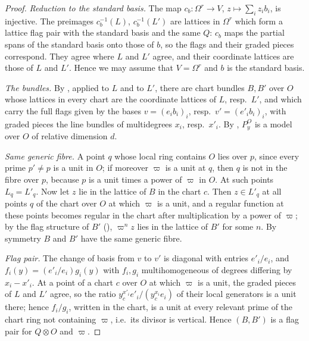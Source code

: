 \begin{proof}
\emph{Reduction to the standard basis.} The map $c_b\colon\Omega^r\to V$, $z\mapsto\sum_iz_ib_i$, is injective.
The preimages $c_b^{-1}(L)$, $c_b^{-1}(L')$ are lattices in $\Omega^r$ which form a lattice flag pair with the
standard basis and the same $Q$: $c_b$ maps the partial spans of the standard basis onto those of $b$, so the flags
and their graded pieces correspond. They agree where $L$ and $L'$ agree, and their coordinate lattices are those of
$L$ and $L'$. Hence we may assume that $V=\Omega^r$ and $b$ is the standard basis.

\emph{The bundles.} By , applied to $L$ and to $L'$, there
are chart bundles $B,B'$ over $O$ whose lattices in every chart are the coordinate lattices of $L$, resp.\ $L'$,
and which carry the full flags given by the bases $v=(e_ib_i)_i$, resp.\ $v'=(e'_ib_i)_i$, with graded pieces the line
bundles of multidegrees $x_i$, resp.\ $x'_i$. By , $P^O_y$ is
a model over $O$ of relative dimension $d$.

\emph{Same generic fibre.} A point $q$ whose local ring contains $O$ lies over $p$, since every prime $p'\ne p$ is a
unit in $O$; if moreover $\varpi$ is a unit at $q$, then $q$ is not in the fibre over $p$, because $p$ is a unit times
a power of $\varpi$ in $O$. At such points $L_q=L'_q$. Now let $z$ lie in the lattice of $B$ in the chart $c$. Then
$z\in L'_q$ at all points $q$ of the chart over $O$ at which $\varpi$ is a unit, and a regular function at these
points becomes regular in the chart after multiplication by a power of $\varpi$; by the flag structure of $B'$
(), $\varpi^nz$ lies in the lattice of $B'$ for
some $n$. By symmetry $B$ and $B'$ have the same generic fibre.

\emph{Flag pair.} The change of basis from $v$ to $v'$ is diagonal with entries $e'_i/e_i$, and
$f_i(y)=(e'_i/e_i)g_i(y)$ with $f_i,g_i$ multihomogeneous of degrees differing by $x_i-x'_i$. At a point of a chart
$c$ over $O$ at which $\varpi$ is a unit, the graded pieces of $L$ and $L'$ agree, so the ratio
$y_c^{x'_i}e'_i/(y_c^{x_i}e_i)$ of their local generators is a unit there; hence $f_i/g_i$, written in the chart, is
a unit at every relevant prime of the chart ring not containing $\varpi$, i.e.\ its divisor is vertical. Hence
$(B,B')$ is a flag pair for $Q\otimes O$ and $\varpi$.
\end{proof}

